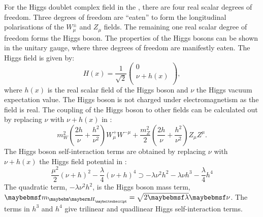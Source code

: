 
For the Higgs doublet complex field in the \SM, there are four real scalar degrees of freedom. Three degrees of freedom are ``eaten'' to form the longitudinal polarisations of the $W^{\pm}_\mu$ and $Z_\mu$ fields. The remaining one real scalar degree of freedom forms the Higgs boson. The properties of the Higgs bosons can be shown in the unitary gauge, where three degrees of freedom are manifestly eaten. The Higgs field is given by:
\begin{equation}
H(x) = \frac{1}{\sqrt{2}}
 \begin{pmatrix}
  0 \\
  \nu + h(x) \\
 \end{pmatrix},
\end{equation}
where $h(x)$ is the real scalar field of the Higgs boson and $\nu$ the Higgs vacuum expectation value. The Higgs boson is not charged under electromagnetism as the field is real. The coupling of the Higgs boson to other fields  can be calculated out by replacing $\nu$  with $\nu + h(x)$ in :
\begin{equation}
m^2_W\left(\frac{2h}{\nu} + \frac{{h}^2}{\nu^2}\right)W^+_{\mu}W^{-\mu} + \frac{m^2_Z}{2}\left(\frac{2h}{\nu} + \frac{{h}^2}{\nu^2}  \right)Z_{\mu}Z^{\mu}.
\label{eq:theoryHiggsBosonic}
\end{equation}
The Higgs boson self-interaction terms are obtained  by replacing $\nu$  with $\nu + h(x)$  the Higgs field potential in :
\begin{equation}
\frac{\mu^2}{2}\left(\nu+h\right)^2 - \frac{\lambda}{4}\left(\nu+h\right)^4 \supset -\lambda\nu^2{h}^2-\lambda\nu{h}^3 - \frac{\lambda}{4}h^4 %
\label{eq:theoryHiggsSelfCoupling}
\end{equation}
The quadratic term, $-\lambda\nu^2{h}^2$, is the Higgs boson mass term, $\Hmass=\sqrt{2\lambda}\nu$. The terms in $h^3$ and $h^4$ give trilinear and quadlinear Higgs self-interaction terms.

